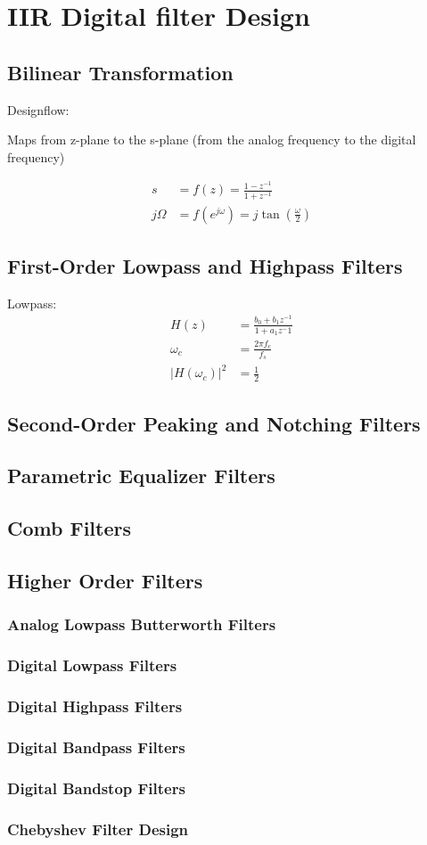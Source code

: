 \section{IIR Digital filter Design}
\subsection{Bilinear Transformation}
Designflow:
\begin{center}

\end{center}
Maps from z-plane to the s-plane (from the analog frequency to the digital
frequency)

\begin{align*}
s 		&= f(z) = \frac{1-z^{-1}}{1+z^{-1}}\\
j\Omega &= f(e^{j\omega}) = j \tan \left( \frac{\omega}{2} \right)
\end{align*}

\subsection{First-Order Lowpass and Highpass Filters}
Lowpass:
\begin{align}
	H(z) &= \frac{b_0 + b_1 z^{-1}}{1+a_1 z^-1}\\
	\omega_c &= \frac{2 \pi f_c}{f_s}\\
	|H(\omega_c)|^2 &= \frac{1}{2}
\end{align}
\subsection{Second-Order Peaking and Notching Filters}
\subsection{Parametric Equalizer Filters}
\subsection{Comb Filters}

\subsection{Higher Order Filters}
\subsubsection{Analog Lowpass Butterworth Filters}
\subsubsection{Digital Lowpass Filters}
\subsubsection{Digital Highpass Filters}
\subsubsection{Digital Bandpass Filters}
\subsubsection{Digital Bandstop Filters}
\subsubsection{Chebyshev Filter Design}
